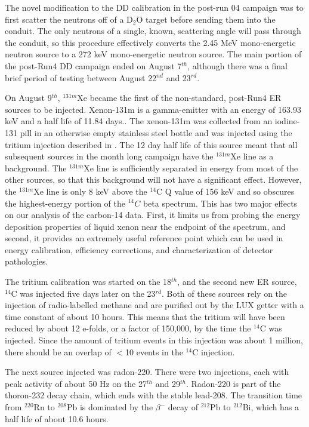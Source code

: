 The novel modification to the DD calibration in the post-run 04 campaign was to first scatter the neutrons off of a D$_2$O target before sending them into the conduit. The only neutrons of a single, known, scattering angle will pass through the conduit, so this procedure effectively converts the 2.45 MeV mono-energetic neutron source to a 272 keV mono-energetic neutron source. The main portion of the post-Run4 DD campaign ended on August 7$^{th}$, although there was a final brief period of testing between August 22$^{nd}$ and 23$^{rd}$.\cite{lux_dd1}


On August 9$^{th}$, $^{131m}$Xe became the first of the non-standard, post-Run4 ER sources to be injected. Xenon-131m is a gamma-emitter with an energy of 163.93 keV and a half life of 11.84 days.\cite{nuclide}. The xenon-131m was collected from an iodine-131 pill in an otherwise empty stainless steel bottle and was injected using the tritium injection described in \cite{lux_tritium}. The 12 day half life of this source meant that all subsequent sources in the month long campaign have the $^{131m}$Xe line as a background. The $^{131m}$Xe line is sufficiently separated in energy from most of the other sources, so that this background will not have a significant effect. However, the $^{131m}$Xe line is only 8 keV above the $^{14}$C Q value of 156 keV and so obscures the highest-energy portion of the $^{14}C$ beta spectrum. This has two major effects on our analysis of the carbon-14 data. First, it limits us from probing the energy deposition properties of liquid xenon near the endpoint of the spectrum, and second, it provides an extremely useful reference point which can be used in energy calibration, efficiency corrections, and characterization of detector pathologies.

The tritium calibration was started on the 18$^{th}$, and the second new ER source, $^{14}$C was injected five days later on the 23$^{rd}$. Both of these sources rely on the injection of radio-labelled methane and are purified out by the LUX getter with a time constant of about 10 hours. This means that the tritium will have been reduced by about 12 e-folds, or a factor of 150,000, by the time the $^{14}$C was injected. Since the amount of tritium events in this injection was about 1 million, there should be an overlap of $<$10 events in the $^{14}$C injection.

The next source injected was radon-220. There were two injections, each with peak activity of about 50 Hz on the 27$^{th}$ and 29$^{th}$. Radon-220 is part of the thoron-232 decay chain, which ends with the stable lead-208. The transition time from $^{220}$Rn to $^{208}$Pb is dominated by the $\beta^-$ decay of $^{212}$Pb to $^{212}$Bi, which has a half life of about 10.6 hours. 

